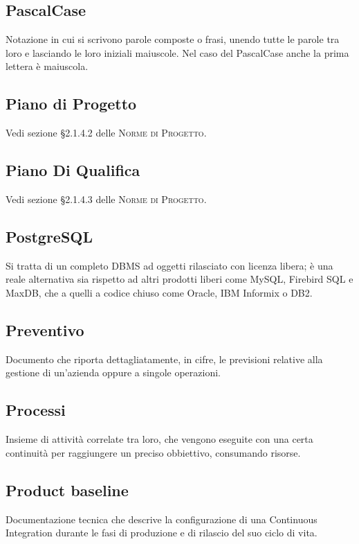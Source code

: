 \documentclass[../glossario.tex]{subfiles}
\begin{document}
\subsection*{PascalCase}
{}
Notazione in cui si scrivono parole composte o frasi, unendo tutte le parole tra loro e lasciando le loro iniziali maiuscole. Nel caso del PascalCase anche la prima lettera è maiuscola.

\subsection*{Piano di Progetto}
{}
Vedi sezione \S2.1.4.2 delle \textsc{Norme di Progetto}.

\subsection*{Piano Di Qualifica}
{}
Vedi sezione \S2.1.4.3 delle \textsc{Norme di Progetto}.

\subsection*{PostgreSQL}
{}
Si tratta di un completo DBMS ad oggetti rilasciato con licenza libera; è una reale alternativa sia rispetto ad altri prodotti liberi come MySQL, Firebird SQL e MaxDB, che a quelli a codice chiuso come Oracle, IBM Informix o DB2.

\subsection*{Preventivo}
{}
Documento che riporta dettagliatamente, in cifre, le previsioni relative alla gestione di un'azienda oppure a singole operazioni.

\subsection*{Processi}
{}
Insieme di attività correlate tra loro, che vengono eseguite con una certa continuità per raggiungere un preciso obbiettivo, consumando risorse.

\subsection*{Product baseline}
{}
Documentazione tecnica che descrive la configurazione di una Continuous Integration durante le fasi di produzione e di rilascio del suo ciclo di vita.
\end{document}
